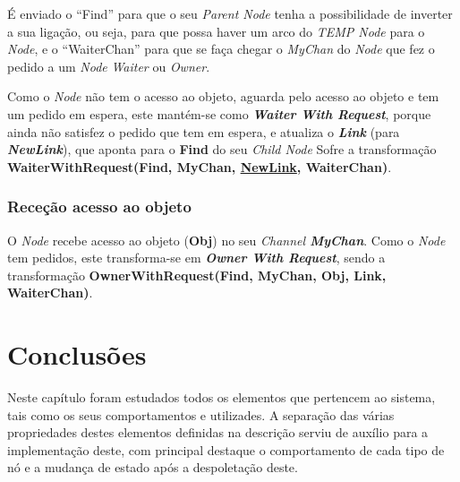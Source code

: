É enviado o ``Find'' para que o seu \emph{Parent Node} tenha a possibilidade de inverter a sua ligação, ou seja, para que possa haver um arco do \emph{TEMP Node} para o \emph{Node}, 
e o ``WaiterChan'' para que se faça chegar o \emph{MyChan} do \emph{Node} que fez o pedido a um \emph{Node} \emph{Waiter} ou \emph{Owner}.

Como o \emph{Node} não tem o acesso ao objeto, aguarda pelo acesso ao objeto e tem um pedido em espera, este mantém-se como \emph{\textbf{Waiter With Request}},
porque ainda não satisfez o pedido que tem em espera, 
e atualiza o \textbf{\emph{Link}} (para \textbf{\emph{NewLink}}), que aponta para o \textbf{Find} do seu \emph{Child Node}
Sofre a transformação \textbf{WaiterWithRequest(Find, MyChan, \underline{NewLink}, WaiterChan)}.


\subsubsection*{Receção acesso ao objeto}
O \emph{Node} recebe acesso ao objeto (\textbf{Obj}) no seu \emph{Channel \textbf{MyChan}}.
Como o \emph{Node} tem pedidos, este transforma-se em \textbf{\emph{Owner With Request}}, sendo a transformação \textbf{OwnerWithRequest(Find, MyChan, Obj, Link, WaiterChan)}.


\section{Conclusões}
Neste capítulo foram estudados todos os elementos que pertencem ao sistema,
tais como os seus comportamentos e utilizades.
A separação das várias propriedades destes elementos definidas na descrição serviu de auxílio para a implementação deste, com principal destaque o comportamento de cada tipo de nó e a mudança de estado após a despoletação deste.  

